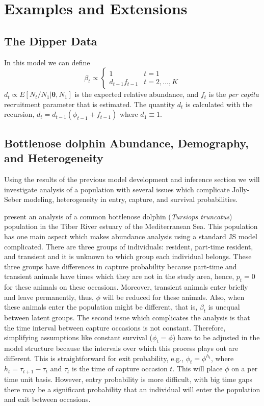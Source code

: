 \documentclass[12pt]{article}
\newcommand{\bt}{\ensuremath{\boldsymbol{\theta}}}
\begin{document}
\section{Examples and Extensions}

\subsection{The Dipper Data}\label{sec:dipper}

In this model we can define 
\[
\beta_t \propto \left\{ \begin{array}{ll}
1  & t=1\\
d_{t-1} f_{t-1} & t=2,\dots,K
\end{array} \right.
\]
$d_t \propto E[N_t/N_1|\bt, N_1]$ is the expected relative abundance, and $f_t$ is the {\it per capita} recruitment parameter that is estimated. The quantity $d_t$ is calculated with the recursion, $d_{t} = d_{t-1}(\phi_{t-1} + f_{t-1})$ where $d_1 \equiv 1$. 

\subsection{Bottlenose dolphin Abundance, Demography, and Heterogeneity}

Using the results of the previous model development and inference section we will investigate analysis of a population with several issues which complicate Jolly-Seber modeling, heterogeneity in entry, capture, and survival probabilities. 

\cite{caruso2024finite} present an analysis of a common bottlenose dolphin ({\it Tursiops truncatus}) population in the Tiber River estuary of the Mediterranean Sea. This population has one main aspect which makes abundance analysis using a standard JS model complicated. There are three groups of individuals: resident, part-time resident, and transient and it is unknown to which group each individual belongs. These three groups have differences in capture probability because part-time and transient animals have times which they are not in the study area, hence, $p_t = 0$ for these animals on these occasions. Moreover, transient animals enter briefly and leave permanently, thus, $\phi$ will be reduced for these animals. Also, when these animals enter the population might be different, that is, $\beta_t$ is unequal between latent groups. The second issue which complicates the analysis is that the time interval between capture occasions is not constant. Therefore, simplifying assumptions like constant survival ($\phi_t=\phi$) have to be adjusted in the model structure because the intervals over which this process plays out are different. This is straightforward for exit probability, e.g., $\phi_t = \phi^{h_t}$, where $h_t=\tau_{t+1}-\tau_t$ and $\tau_t$ is the time of capture occasion $t$. This will place $\phi$ on a per time unit basis. However, entry probability is more difficult, with big time gaps there may be a significant probability that an individual will enter the population and exit between occasions. 
\end{document}
